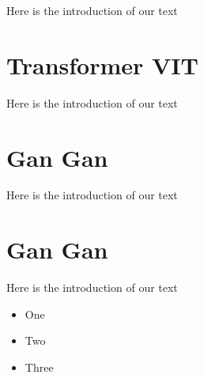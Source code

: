 \documentclass[12pt]{article}
\begin{document}
Here is the introduction of our text

\section{Transformer VIT}

Here is the introduction of our text

\section{Gan Gan}

Here is the introduction of our text

\section{Gan Gan}

Here is the introduction of our text

\begin{itemize}

\item One

\item Two

\item Three

\end{itemize}
\end{document}
